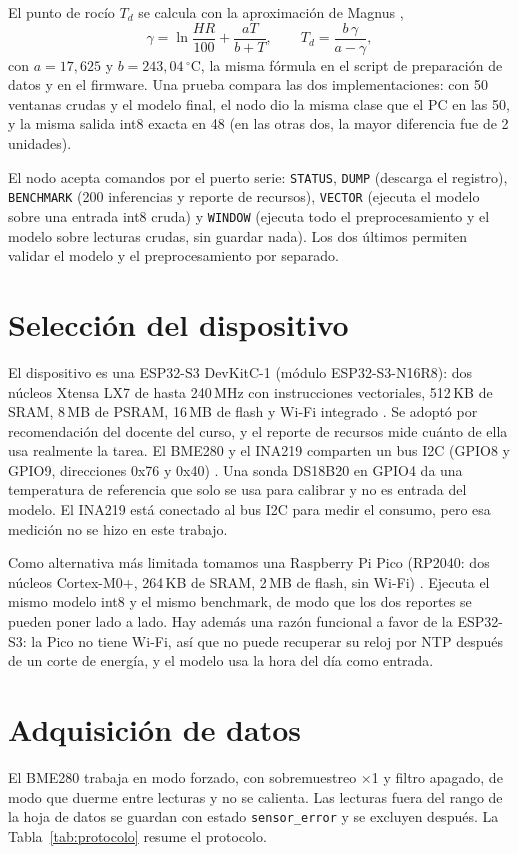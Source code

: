 \documentclass[conference]{IEEEtran}
\begin{document}
El punto de roc\'io $T_d$ se calcula con la aproximaci\'on de Magnus \cite{alduchov1996},
\begin{equation}
\gamma = \ln\frac{HR}{100} + \frac{aT}{b+T}, \qquad T_d = \frac{b\,\gamma}{a-\gamma},
\end{equation}
con $a=17{,}625$ y $b=243{,}04\,^\circ$C, la misma f\'ormula en el script de preparaci\'on de datos y en el firmware. Una prueba compara las dos implementaciones: con 50 ventanas crudas y el modelo final, el nodo dio la misma clase que el PC en las 50, y la misma salida int8 exacta en 48 (en las otras dos, la mayor diferencia fue de 2 unidades).

El nodo acepta comandos por el puerto serie: \texttt{STATUS}, \texttt{DUMP} (descarga el registro), \texttt{BENCHMARK} (200 inferencias y reporte de recursos), \texttt{VECTOR} (ejecuta el modelo sobre una entrada int8 cruda) y \texttt{WINDOW} (ejecuta todo el preprocesamiento y el modelo sobre lecturas crudas, sin guardar nada). Los dos \'ultimos permiten validar el modelo y el preprocesamiento por separado.

\section{Selecci\'on del dispositivo}
El dispositivo es una ESP32-S3 DevKitC-1 (m\'odulo ESP32-S3-N16R8): dos n\'ucleos Xtensa LX7 de hasta 240\,MHz con instrucciones vectoriales, 512\,KB de SRAM, 8\,MB de PSRAM, 16\,MB de flash y Wi-Fi integrado \cite{esp32s3}. Se adopt\'o por recomendaci\'on del docente del curso, y el reporte de recursos mide cu\'anto de ella usa realmente la tarea. El BME280 y el INA219 comparten un bus I2C (GPIO8 y GPIO9, direcciones 0x76 y 0x40) \cite{bme280}. Una sonda DS18B20 en GPIO4 da una temperatura de referencia que solo se usa para calibrar y no es entrada del modelo. El INA219 est\'a conectado al bus I2C para medir el consumo, pero esa medici\'on no se hizo en este trabajo.

Como alternativa m\'as limitada tomamos una Raspberry Pi Pico (RP2040: dos n\'ucleos Cortex-M0+, 264\,KB de SRAM, 2\,MB de flash, sin Wi-Fi) \cite{rp2040}. Ejecuta el mismo modelo int8 y el mismo benchmark, de modo que los dos reportes se pueden poner lado a lado. Hay adem\'as una raz\'on funcional a favor de la ESP32-S3: la Pico no tiene Wi-Fi, as\'i que no puede recuperar su reloj por NTP despu\'es de un corte de energ\'ia, y el modelo usa la hora del d\'ia como entrada.

\section{Adquisici\'on de datos}
El BME280 trabaja en modo forzado, con sobremuestreo $\times$1 y filtro apagado, de modo que duerme entre lecturas y no se calienta. Las lecturas fuera del rango de la hoja de datos se guardan con estado \texttt{sensor\_error} y se excluyen despu\'es. La Tabla~\ref{tab:protocolo} resume el protocolo.
\end{document}
